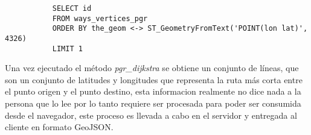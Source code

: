        \begin{verbatim}
           SELECT id
           FROM ways_vertices_pgr
           ORDER BY the_geom <-> ST_GeometryFromText('POINT(lon lat)', 4326)
           LIMIT 1
       \end{verbatim}

       Una vez ejecutado el método \emph{pgr\_dijkstra} se obtiene un conjunto de líneas, que son un conjunto de latitudes y longitudes que representa la ruta más corta entre el punto origen y el punto destino, esta informacion realmente no dice nada a la persona que lo lee por lo tanto requiere ser procesada para poder ser consumida desde el navegador, este proceso es llevada a cabo en el servidor y entregada al cliente en formato GeoJSON.\\














